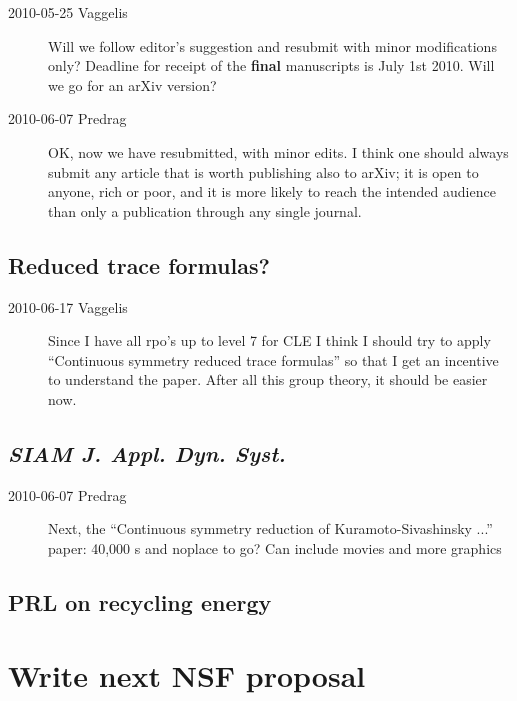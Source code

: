 \begin{description}

\item[2010-05-25 Vaggelis]
Will we follow editor's suggestion and resubmit with minor modifications only?
Deadline for receipt of the {\bf final} manuscripts is July 1st 2010.
Will we go for an arXiv version?

\item[2010-06-07 Predrag]
OK, now we have resubmitted, with minor edits. I think one should always submit
any article that is worth publishing also to arXiv;
it is open to anyone, rich or poor, and it is
more likely to reach the intended audience than only a publication through
any single journal.

\end{description}

\subsection{Reduced trace formulas?}

\begin{description}
 \item[2010-06-17 Vaggelis]
Since I have all rpo's up to level 7 for CLE I think I should try 
to apply ``Continuous symmetry reduced trace formulas'' so that I get an incentive
to understand the paper. After all this group theory, it should be easier now.
\end{description}


\subsection{\emph{SIAM J. Appl. Dyn. Syst.}}

\begin{description} 

\item[2010-06-07 Predrag] Next, the
``Continuous symmetry reduction of Kuramoto-Sivashinsky ...'' paper:
40,000 \rpo s and noplace to go?
Can include movies and more graphics

\end{description}

\subsection{PRL on recycling energy}

\section{Write next NSF proposal }

